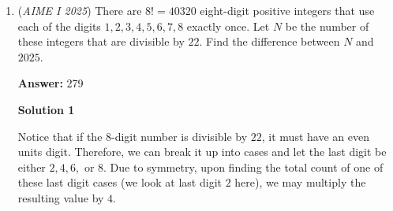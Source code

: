 \begin{enumerate}
 You get: 
 \[\frac{-b \pm \sqrt{b^2-4ac}}{2a}\]

 \[\frac{xy \pm \sqrt{x^2 y^2 + (12\cdot6\cdot4\cdot x^2 \cdot y^2)}}{24x^2}\]

 \[= \frac{xy \pm\sqrt{289x^2 y^2}}{24x^2}\]

 \[= \frac{18xy}{24x^2}\text{, and }\frac{-16xy}{24x^2}\]

 Rather than putting this equation as zero, the numerators and denominators must be equal [EDIT: We set each value equal to one because the quadratic is taken with respect to the root $1$]. These two equations simplify to:

 
 \[3y = 4x;\] 
 \[-2y = 3x;\] 

 As $x$ and $y$ are between $-100$ and $100$, for the first equation, $x$ can be from $[-75,75]$, but $x$ must be a multiple of $3$, so there are:

 $((75+75)/3) + 1 = 51$ solutions for this case.

 For 
 \[-2y = 3x:\]
$x$ can be between $[-66, 66]$, but $x$ has to be a multiple of $2$.

 Therefore, there are $(66+66)/2 + 1 = 67$ solutions for this case.

 However, the one overlap would be $x = 0$, because y would be $0$ in both solutions.

 Therefore, the answer is $51+67-1 = \boxed{117}.$

 
-U-King3.14Root-LaTeX corrected by Andrew2019-clarified by golden\_star\_123

 


	\item (\textit{AIME I 2025}) There are $8!= 40320$ eight-digit positive integers that use each of the digits $1, 2, 3, 4, 5, 6, 7, 8$ exactly once. Let $N$ be the number of these integers that are divisible by $22$. Find the difference between $N$ and $2025$.


 
 \textbf{Answer: }279



\textbf{Solution 1}

Notice that if the 8-digit number is divisible by $22$, it must have an even units digit. Therefore, we can break it up into cases and let the last digit be either $2, 4, 6,$ or $8$. Due to symmetry, upon finding the total count of one of these last digit cases (we look at last digit $2$ here), we may multiply the resulting value by $4$.


\end{enumerate}
